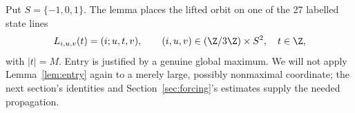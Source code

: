 Put \(S=\{-1,0,1\}\). The lemma places the lifted orbit on one of
the 27 labelled state lines
\begin{equation}\label{eq:state_line}
 L_{i,u,v}(t)=(i;u,t,v),\qquad
 (i,u,v)\in(\Z/3\Z)\times S^2,\quad t\in\Z,
\end{equation}
with \(|t|=M\). Entry is justified by a genuine global maximum.
We will not apply Lemma~\ref{lem:entry} again to a merely large,
possibly nonmaximal coordinate; the next section's identities and
Section~\ref{sec:forcing}'s estimates supply the needed propagation.
